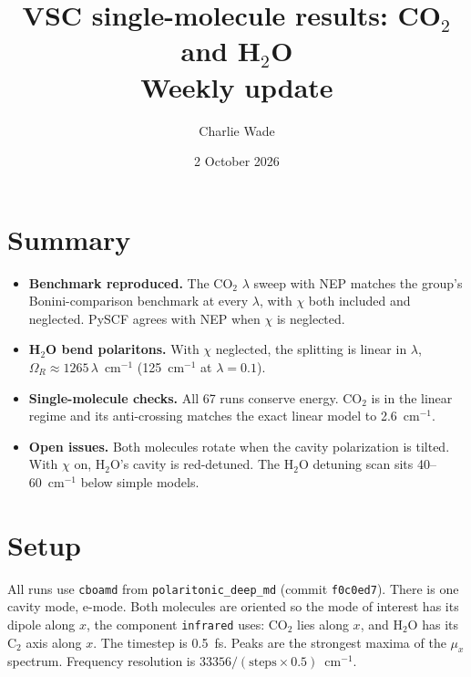\documentclass[11pt]{article}
\title{VSC single-molecule results: CO$_2$ and H$_2$O\\[2pt]\large Weekly update}
\author{Charlie Wade}
\date{2 October 2026}
\begin{document}
\maketitle

\section*{Summary}

\begin{itemize}
  \item \textbf{Benchmark reproduced.} The CO$_2$ $\lambda$ sweep with NEP matches the
        group's Bonini-comparison benchmark at every $\lambda$, with
        $\chi$ both included and neglected. PySCF agrees with NEP when $\chi$ is neglected.
  \item \textbf{H$_2$O bend polaritons.} With $\chi$ neglected, the splitting is linear
        in $\lambda$, $\Omega_R \approx 1265\,\lambda$~cm$^{-1}$ (125~cm$^{-1}$ at $\lambda=0.1$).
  \item \textbf{Single-molecule checks.} All 67 runs conserve energy. CO$_2$ is in the
        linear regime and its anti-crossing matches the exact linear model to 2.6~cm$^{-1}$.
  \item \textbf{Open issues.} Both molecules rotate when the cavity polarization is
        tilted. With $\chi$ on, H$_2$O's cavity is red-detuned. The H$_2$O detuning scan
        sits 40--60~cm$^{-1}$ below simple models.
\end{itemize}

\section*{Setup}

All runs use \texttt{cboamd} from \texttt{polaritonic\_deep\_md} (commit \texttt{f0c0ed7}).
There is one cavity mode, e-mode. Both molecules are oriented so the mode of interest has
its dipole along $x$, the component \texttt{infrared} uses: CO$_2$ lies along $x$, and
H$_2$O has its C$_2$ axis along $x$. The timestep is 0.5~fs. Peaks are the strongest
maxima of the $\mu_x$ spectrum. Frequency resolution is $33356/(\text{steps}\times0.5)$~cm$^{-1}$.
\end{document}
